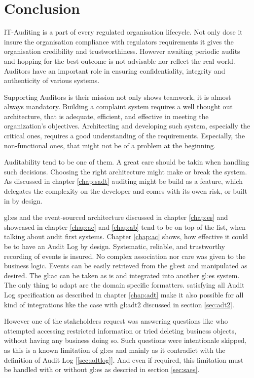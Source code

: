 %
\chapter{Conclusion}

IT-Auditing is a part of every regulated organisation lifecycle. Not only dose it insure the organisation compliance with regulators requirements it gives the organisation credibility and trustworthiness.  However awaiting periodic audits and hopping for the best outcome is not advisable nor reflect the real world. Auditors have an important role in ensuring confidentiality, integrity and authenticity of various systems.

Supporting Auditors is their mission not only shows teamwork, it is almost always mandatory. Building a complaint system requires a well thought out architecture, that is adequate, efficient, and effective in meeting the organization’s objectives. Architecting and developing such system, especially the critical ones, requires a good understanding of the requirements. Especially, the non-functional ones, that might not be of a problem at the beginning.

Auditability tend to be one of them. A great care should be takin when handling such decisions. Choosing the right architecture might make or break the system. As discussed in chapter \ref{chap:sadt} auditing might be build as a feature, which delegates the complexity on the developer and comes with its owen risk, or built in by design.

\gls{gl:es} and the event-sourced architecture discussed in chapter \ref{chap:es} and showcased in chapter \ref{chap:ac} and \ref{chap:ab} tend to be on top of the list, when talking about audit first systems. Chapter \ref{chap:ac} shows, how effective it could be to have an Audit Log by design. Systematic, reliable, and trustworthy recording of events is insured. No complex association nor care was given to the business logic. Events can be easily retrieved from the \gls{gl:est} and manipulated as desired. The \gls{gl:ac} can be taken as is and integrated into another \gls{gl:es} system. The only thing to adapt are the domain specific formatters. satisfying all Audit Log specification as described in chapter \ref{chap:adt} make it also possible for all kind of integrations like the case with \gls{gl:adt2} discussed in section \ref{sec:adt2}. 

However one of the stakeholders request was answering questions like who attempted accessing restricted information or tried deleting business objects, without having any business doing so. Such questions were intentionale skipped, as this is a known limitation of \gls{gl:es} and mainly as it contradict with the definition of Audit Log [\ref{sec:adtlog}]. And even if required, this limitation must be handled with or without \gls{gl:es} as descried in section \ref{sec:saes}.


